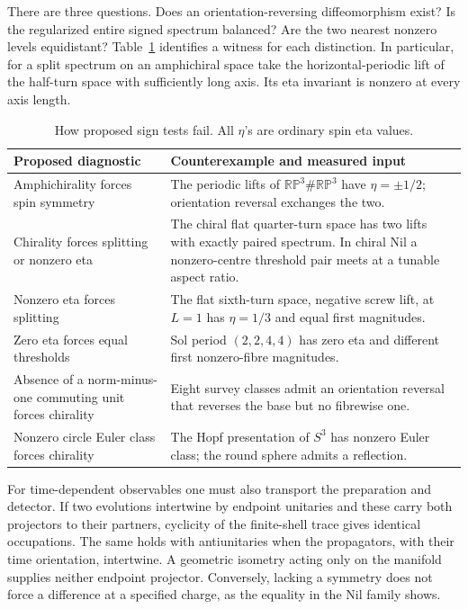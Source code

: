 There are three questions. Does an orientation-reversing diffeomorphism exist? Is the regularized entire signed spectrum balanced? Are the two nearest nonzero levels equidistant? Table~\ref{tab:fail} identifies a witness for each distinction. In particular, for a split spectrum on an amphichiral space take the horizontal-periodic lift of the half-turn space with sufficiently long axis. Its eta invariant is nonzero at every axis length.
\begin{table}[htbp]\centering\small
\caption{How proposed sign tests fail. All \(\eta\)'s are ordinary spin eta values.}\label{tab:fail}
\begin{tabularx}{\linewidth}{@{}p{.33\linewidth}X@{}}\toprule
Proposed diagnostic & Counterexample and measured input\\\midrule
Amphichirality forces spin symmetry & The periodic lifts of \(\mathbb{RP}^3\#\mathbb{RP}^3\) have \(\eta=\pm1/2\); orientation reversal exchanges the two.\\
Chirality forces splitting or nonzero eta & The chiral flat quarter-turn space has two lifts with exactly paired spectrum. In chiral Nil a nonzero-centre threshold pair meets at a tunable aspect ratio.\\
Nonzero eta forces splitting & The flat sixth-turn space, negative screw lift, at \(L=1\) has \(\eta=1/3\) and equal first magnitudes.\\
Zero eta forces equal thresholds & Sol period \((2,2,4,4)\) has zero eta and different first nonzero-fibre magnitudes.\\
Absence of a norm-minus-one commuting unit forces chirality & Eight survey classes admit an orientation reversal that reverses the base but no fibrewise one.\\
Nonzero circle Euler class forces chirality & The Hopf presentation of \(S^3\) has nonzero Euler class; the round sphere admits a reflection.\\\bottomrule
\end{tabularx}
\end{table}
For time-dependent observables one must also transport the preparation and detector. If two evolutions intertwine by endpoint unitaries and these carry both projectors to their partners, cyclicity of the finite-shell trace gives identical occupations. The same holds with antiunitaries when the propagators, with their time orientation, intertwine. A geometric isometry acting only on the manifold supplies neither endpoint projector. Conversely, lacking a symmetry does not force a difference at a specified charge, as the equality in the Nil family shows.
